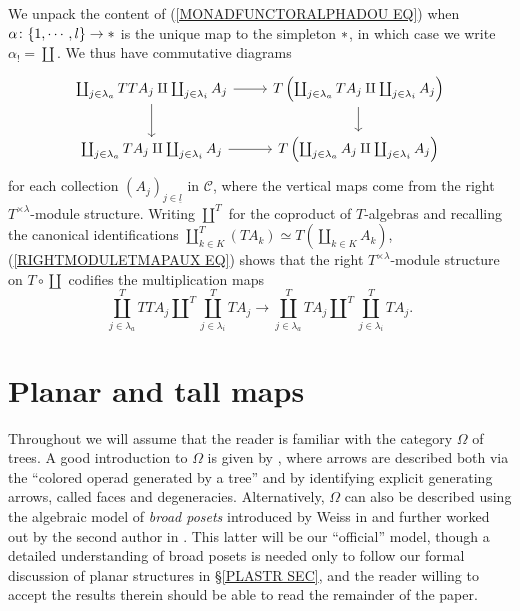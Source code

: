 \documentclass[a4paper,10pt]{article}%
\begin{document}
\begin{remark}\label{PRECOMPPOSTCOMP REM}
We unpack the content of (\ref{MONADFUNCTORALPHADOU EQ}) when 
$\alpha \colon \{1,\cdots,l\} \to \**$ is the unique map to the simpleton $\**$, in which case we write $\alpha_{!} = \coprod$.
We thus have commutative diagrams
\begin{equation}\label{RIGHTMODULETMAPAUX EQ}
\begin{tikzcd}
	\coprod_{j \in \lambda_a} TT A_j \amalg \coprod_{j \in \lambda_i} A_j
	\ar{r} \ar{d} &
	T\left( \coprod_{j \in \lambda_a} T A_j \amalg \coprod_{j \in \lambda_i} A_j \right) \ar{d}
\\
	\coprod_{j \in \lambda_a} T A_j \amalg \coprod_{j \in \lambda_i} A_j
	\ar{r} &
		T\left( \coprod_{j \in \lambda_a} A_j \amalg \coprod_{j \in \lambda_i} A_j \right)
\end{tikzcd}
\end{equation}
for each collection $\left( A_j \right)_{j\in\underline{l}}$ in $\mathcal{C}$,
where the vertical maps
come from the right $T^{\times \lambda}$-module structure.
Writing $\amalg^T$ for the coproduct of $T$-algebras and recalling the canonical identifications 
$\coprod^T_{k \in K} (T A_k) \simeq T
\left( \coprod_{k \in K} A_k \right)$, 
(\ref{RIGHTMODULETMAPAUX EQ}) shows that the 
right $T^{\times \lambda}$-module structure on $T \circ \coprod$
codifies the multiplication maps
\[
\coprod^T_{j \in \lambda_a} TT A_j \amalg^T 
\coprod^T_{j \in \lambda_i} T A_j
	\to
\coprod^T_{j \in \lambda_a} T A_j \amalg^T 
\coprod^T_{j \in \lambda_i} T A_j.
\] 
\end{remark}






\section{Planar and tall maps}\label{PLANAR_SECTION}


Throughout we will assume that the reader is familiar with the category $\Omega$ of trees.
A good introduction to $\Omega$ is given by 
\cite[\S 3]{MW07}, where arrows are described both via 
the ``colored operad generated by a tree''  and by identifying explicit generating arrows, called faces and degeneracies.
Alternatively, $\Omega$ can also be described 
using the algebraic model of 
\textit{broad posets}
introduced by Weiss in \cite{We12} and further worked out by the second author in \cite[\S 5]{Pe17}.
This latter will be our ``official'' model,
though a detailed understanding of broad posets is needed only
to follow our formal discussion of planar structures in \S \ref{PLASTR SEC},
and the reader willing to accept the results therein should be able to read the remainder of the paper.
\end{document}
